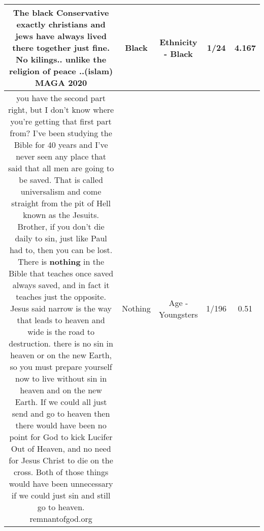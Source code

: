 \documentclass[11pt]{article}
\newlength\mylength
\begin{document}
\begin{center}
\begin{longtable}{|C{.65\mylength}|C{.30\mylength}|C{.12\mylength}|C{.12\mylength}|C{.12\mylength}|}
  \small The \textbf{black} Conservative exactly christians and jews have always lived there together just fine. No kilings.. unlike the religion of peace ..(islam) MAGA 2020\normalsize   & Black & Ethnicity - Black & 1/24 & 4.167 \\  \hline
  \small {} you have the second part right, but I don't know where you're getting that first part from? I've been studying the Bible for 40 years and I've never seen any place that said that all men are going to be saved. That is called universalism and come straight from the pit of Hell known as the Jesuits. Brother, if you don't die daily to sin, just like Paul had to, then you can be lost. There is \textbf{nothing} in the Bible that teaches once saved always saved, and in fact it teaches just the opposite. Jesus said narrow is the way that leads to heaven and wide is the road to destruction. there is no sin in heaven or on the new Earth, so you must prepare yourself now to live without sin in heaven and on the new Earth. If we could all just send and go to heaven then there would have been no point for God to kick Lucifer Out of Heaven, and no need for Jesus Christ to die on the cross. Both of those things would have been unnecessary if we could just sin and still go to heaven. remnantofgod.org\normalsize   & Nothing & Age - Youngsters & 1/196 & 0.51 \\  \hline

\end{longtable}
\end{center}
\end{document}
